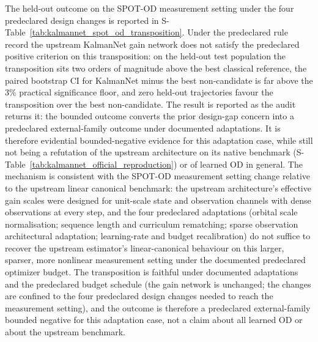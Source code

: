 \documentclass{article}
\begin{document}
The held-out outcome on the SPOT-OD measurement setting under the four predeclared design changes is reported in S-Table~\ref{tab:kalmannet_spot_od_transposition}. Under the predeclared rule record the upstream KalmanNet gain network does not satisfy the predeclared positive criterion on this transposition: on the held-out test population the transposition sits two orders of magnitude above the best classical reference, the paired bootstrap CI for KalmanNet minus the best non-candidate is far above the 3\% practical significance floor, and zero held-out trajectories favour the transposition over the best non-candidate. The result is reported as the audit returns it: the bounded outcome converts the prior design-gap concern into a predeclared external-family outcome under documented adaptations. It is therefore evidential bounded-negative evidence for this adaptation case, while still not being a refutation of the upstream architecture on its native benchmark (S-Table~\ref{tab:kalmannet_official_reproduction}) or of learned OD in general. The mechanism is consistent with the SPOT-OD measurement setting change relative to the upstream linear canonical benchmark: the upstream architecture's effective gain scales were designed for unit-scale state and observation channels with dense observations at every step, and the four predeclared adaptations (orbital scale normalisation; sequence length and curriculum rematching; sparse observation architectural adaptation; learning-rate and budget recalibration) do not suffice to recover the upstream estimator's linear-canonical behaviour on this larger, sparser, more nonlinear measurement setting under the documented predeclared optimizer budget. The transposition is faithful under documented adaptations and the predeclared budget schedule (the gain network is unchanged; the changes are confined to the four predeclared design changes needed to reach the measurement setting), and the outcome is therefore a predeclared external-family bounded negative for this adaptation case, not a claim about all learned OD or about the upstream benchmark.


\end{document}
